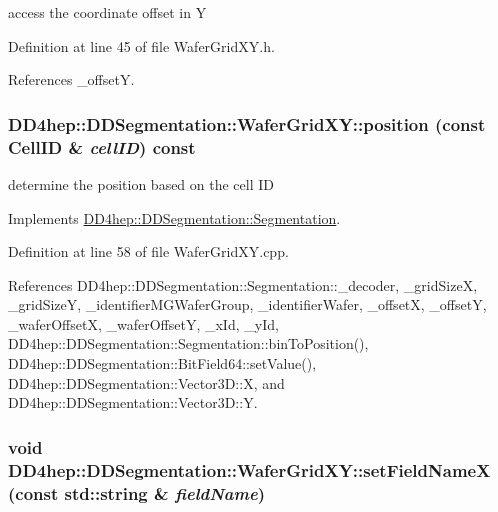 access the coordinate offset in Y 

Definition at line 45 of file WaferGridXY.h.

References \_\-offsetY.\hypertarget{class_d_d4hep_1_1_d_d_segmentation_1_1_wafer_grid_x_y_a1f72c4a0bc0cfbabe6395612518a4d34}{
\subsubsection[{position}]{ DD4hep::DDSegmentation::WaferGridXY::position (const {\bf CellID} \& {\em cellID}) const}}
\label{class_d_d4hep_1_1_d_d_segmentation_1_1_wafer_grid_x_y_a1f72c4a0bc0cfbabe6395612518a4d34}


determine the position based on the cell ID 

Implements \hyperlink{class_d_d4hep_1_1_d_d_segmentation_1_1_segmentation_a594fe6d78667415855858d083b64acad}{DD4hep::DDSegmentation::Segmentation}.

Definition at line 58 of file WaferGridXY.cpp.

References DD4hep::DDSegmentation::Segmentation::\_\-decoder, \_\-gridSizeX, \_\-gridSizeY, \_\-identifierMGWaferGroup, \_\-identifierWafer, \_\-offsetX, \_\-offsetY, \_\-waferOffsetX, \_\-waferOffsetY, \_\-xId, \_\-yId, DD4hep::DDSegmentation::Segmentation::binToPosition(), DD4hep::DDSegmentation::BitField64::setValue(), DD4hep::DDSegmentation::Vector3D::X, and DD4hep::DDSegmentation::Vector3D::Y.\hypertarget{class_d_d4hep_1_1_d_d_segmentation_1_1_wafer_grid_x_y_a4306fcd58177d9f24abd274a944eca6f}{
\subsubsection[{setFieldNameX}]{\setlength{\rightskip}{0pt plus 5cm}void DD4hep::DDSegmentation::WaferGridXY::setFieldNameX (const std::string \& {\em fieldName})}}
\label{class_d_d4hep_1_1_d_d_segmentation_1_1_wafer_grid_x_y_a4306fcd58177d9f24abd274a944eca6f}


